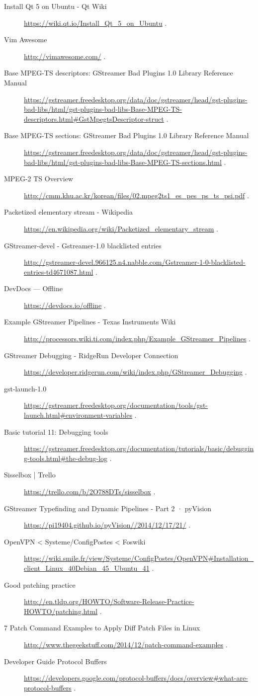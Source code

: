 \begin{description}
\item [Install Qt 5 on Ubuntu - Qt Wiki] \url{https://wiki.qt.io/Install_Qt_5_on_Ubuntu} . 
\item [Vim Awesome] \url{http://vimawesome.com/} . 
\item [Base MPEG-TS descriptors: GStreamer Bad Plugins 1.0 Library Reference Manual] \url{https://gstreamer.freedesktop.org/data/doc/gstreamer/head/gst-plugins-bad-libs/html/gst-plugins-bad-libs-Base-MPEG-TS-descriptors.html#GstMpegtsDescriptor-struct} . 
\item [Base MPEG-TS sections: GStreamer Bad Plugins 1.0 Library Reference Manual] \url{https://gstreamer.freedesktop.org/data/doc/gstreamer/head/gst-plugins-bad-libs/html/gst-plugins-bad-libs-Base-MPEG-TS-sections.html} . 
\item [MPEG-2 TS Overview] \url{http://cmm.khu.ac.kr/korean/files/02.mpeg2ts1_es_pes_ps_ts_psi.pdf} . 
\item [Packetized elementary stream - Wikipedia] \url{https://en.wikipedia.org/wiki/Packetized_elementary_stream} . 
\item [GStreamer-devel - Gstreamer-1.0 blacklisted entries] \url{http://gstreamer-devel.966125.n4.nabble.com/Gstreamer-1-0-blacklisted-entries-td4671087.html} . 
\item [DevDocs — Offline] \url{https://devdocs.io/offline} . 
\item [Example GStreamer Pipelines - Texas Instruments Wiki] \url{http://processors.wiki.ti.com/index.php/Example_GStreamer_Pipelines} . 
\item [GStreamer Debugging - RidgeRun Developer Connection] \url{https://developer.ridgerun.com/wiki/index.php/GStreamer_Debugging} . 
\item [gst-launch-1.0] \url{https://gstreamer.freedesktop.org/documentation/tools/gst-launch.html#environment-variables} . 
\item [Basic tutorial 11: Debugging tools] \url{https://gstreamer.freedesktop.org/documentation/tutorials/basic/debugging-tools.html#the-debug-log} . 
\item [Sisselbox | Trello] \url{https://trello.com/b/2O788DTs/sisselbox} . 
\item [GStreamer Typefinding and Dynamic Pipelines - Part 2 · pyVision] \url{https://pi19404.github.io/pyVision//2014/12/17/21/} . 
\item [OpenVPN < Systeme/ConfigPostes < Foswiki] \url{https://wiki.smile.fr/view/Systeme/ConfigPostes/OpenVPN#Installation_client_Linux_40Debian_45_Ubuntu_41} . 
\item [Good patching practice] \url{http://en.tldp.org/HOWTO/Software-Release-Practice-HOWTO/patching.html} . 
\item [7 Patch Command Examples to Apply Diff Patch Files in Linux] \url{http://www.thegeekstuff.com/2014/12/patch-command-examples} .
\item [Developer Guide Protocol Buffers] \url{https://developers.google.com/protocol-buffers/docs/overview#what-are-protocol-buffers} .

\end{description}